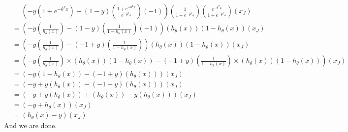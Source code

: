 \documentclass[12pt]{article} %
\begin{document}
\begin{flushleft}
\begin{enumerate}
		\begin{align*}
			&= (-y(1+e^{-\theta^Tx}) - (1-y)(\frac{1+e^{-\theta^Tx}}{e^{-\theta^Tx}})(-1))(\frac{1}{1+e^{-\theta^Tx}})(\frac{e^{-\theta^Tx}}{1+e^{-\theta^Tx}})(x_J) &&\\
			&= (-y(\frac{1}{h_\theta(x)}) - (1-y)(\frac{1}{1-h_\theta(x)})(-1))(h_\theta(x))(1 - h_\theta(x))(x_J) &&\\
			&= (-y(\frac{1}{h_\theta(x)}) - (-1+y)(\frac{1}{1-h_\theta(x)}))(h_\theta(x))(1 - h_\theta(x))(x_J) &&\\
			&= (-y(\frac{1}{h_\theta(x)})\times(h_\theta(x))(1 - h_\theta(x)) - (-1+y)(\frac{1}{1-h_\theta(x)})\times(h_\theta(x))(1 - h_\theta(x)))(x_J) &&\\
			&= (-y(1-h_\theta(x)) - (-1+y)(h_\theta(x)))(x_J) &&\\
			&= (-y + y(h_\theta(x)) - (-1 + y)(h_\theta(x)))(x_J) &&\\
			&= (-y + y(h_\theta(x))  + (h_\theta(x)) - y(h_\theta(x)))(x_J) &&\\
			&= (-y + h_\theta(x))(x_J) &&\\	
			&= (h_\theta(x) - y)(x_J)
		\end{align*}
		And we are done.
\end{enumerate}

\end{flushleft}
\end{document}
